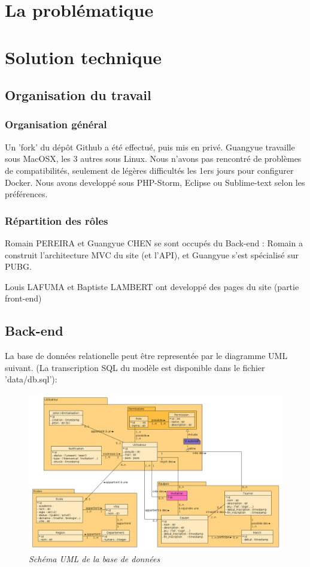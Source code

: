 \documentclass[10pt]{article}
\begin{document}
  \newpage
  \section{La problématique}
  
  \newpage
  \section{Solution technique}
    \subsection{Organisation du travail}
      \subsubsection{Organisation général}
	Un 'fork' du dépôt Github a été effectué, puis mis en privé. Guangyue travaille sous MacOSX, les 3 autres sous Linux.
	Nous n'avons pas rencontré de problèmes de compatibilités, seulement de légères difficultés les 1ers jours pour configurer Docker.
	Nous avons developpé sous PHP-Storm, Eclipse ou Sublime-text selon les préférences.
      \subsubsection{Répartition des rôles}
	Romain PEREIRA et Guangyue CHEN se sont occupés du Back-end : Romain a construit l'architecture MVC du site (et l'API),
	et Guangyue s'est spécialisé sur PUBG.
	
	Louis LAFUMA et Baptiste LAMBERT ont developpé des pages du site (partie front-end)
    \subsection{Back-end}
      La base de données relationelle peut être representée par le diagramme UML suivant.
      \newline
      (La transcription SQL du modèle est disponible dans le fichier 'data/db.sql'):
      \begin{figure}[H]
	\begin{center}
	  \includegraphics[width=17.5cm,keepaspectratio]{./images/uml.png}
	\end{center}
	\caption{\textit{Schéma UML de la base de données}}
	\label{uml}
      \end{figure}
      
\end{document}
